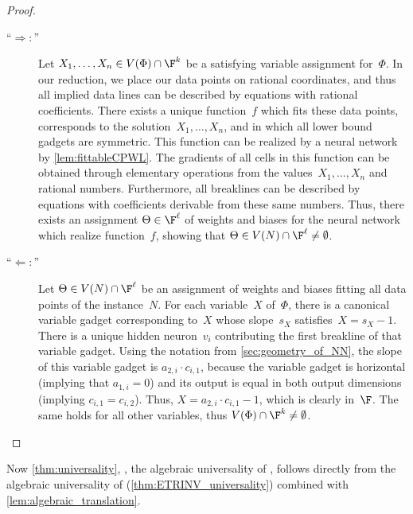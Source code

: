 \begin{proof}
    \begin{description}
        \item[\enquote{$\Longrightarrow:$}]
        Let $X_1, \ldots, X_n \in V(\Phi) \cap \F^k$ be a satisfying variable assignment for~$\Phi$.
        In our reduction, we place our data points on rational coordinates, and thus all implied data lines can be described by equations with rational coefficients.
        There exists a unique \CPWL function~$f$ which fits these data points, corresponds to the solution~$X_1, \ldots, X_n$, and in which all lower bound gadgets are symmetric.
        This function can be realized by a \fullyconnected \twolayer neural network by \cref{lem:fittableCPWL}.
        The gradients of all cells in this function can be obtained through elementary operations from the values~$X_1, \ldots, X_n$ and rational numbers.
        Furthermore, all breaklines can be described by equations with coefficients derivable from these same numbers.
        Thus, there %
exists an assignment $\Theta \in \F^\ell$ of weights and biases %
for the neural network which realize function~$f$, showing that $\Theta \in V(N) \cap \F^\ell \neq \emptyset$.
        
        \item[\enquote{$\Longleftarrow:$}]
         Let $\Theta \in V(N) \cap \F^\ell$ be %
an assignment %
of weights and biases fitting all data points of the \trainNN instance~$N$.
        For each variable~$X$ of~$\Phi$, there is a canonical variable gadget corresponding to~$X$ whose slope~$s_X$ satisfies~$X = s_X - 1$.
        There is a unique hidden neuron~$v_i$ contributing the first breakline of that variable gadget.
        Using the notation from \cref{sec:geometry_of_NN}, the slope of this variable gadget is $a_{2,i} \cdot c_{i,1}$, because the variable gadget is horizontal (implying that $a_{1,i} = 0$) and its output is equal in both output dimensions (implying $c_{i,1} = c_{i,2}$).
        Thus, $X = a_{2,i} \cdot c_{i,1} - 1$, which is clearly in~$\F$.
        The same holds for all other variables, thus $V(\Phi) \cap \F^k \neq \emptyset$.
        \qedhere
    \end{description}
\end{proof}

Now \cref{thm:universality}, \ie,  the algebraic universality of \trainNN, follows directly from the algebraic universality of \ETRINV (\cref{thm:ETRINV_universality}) combined with \cref{lem:algebraic_translation}.


\nocite{conf-version}

